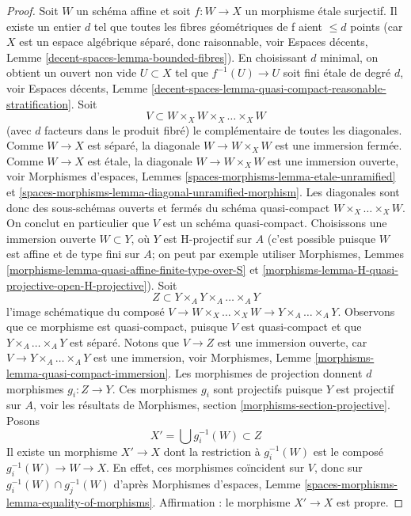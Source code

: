 \begin{proof}
Soit $W$ un schéma affine et soit $f : W \to X$ un morphisme
\'etale surjectif. Il existe un entier $d$ tel que toutes les fibres géométriques
de f aient $\leq d$ points (car $X$ est un espace algébrique séparé,
donc raisonnable, voir
Espaces décents, Lemme \ref{decent-spaces-lemma-bounded-fibres}).
En choisissant $d$ minimal, on obtient un ouvert non vide $U \subset X$ tel que
$f^{-1}(U) \to U$ soit fini \'etale de degré $d$, voir
Espaces décents, Lemme
\ref{decent-spaces-lemma-quasi-compact-reasonable-stratification}.
Soit
$$
V \subset W \times_X W \times_X \ldots \times_X W
$$
(avec $d$ facteurs dans le produit fibré) le complémentaire de toutes les diagonales.
Comme $W \to X$ est séparé, la diagonale $W \to W \times_X W$ est une
immersion fermée. Comme $W \to X$ est \'etale, la diagonale
$W \to W \times_X W$ est une immersion ouverte, voir
Morphismes d'espaces, Lemmes
\ref{spaces-morphisms-lemma-etale-unramified} et
\ref{spaces-morphisms-lemma-diagonal-unramified-morphism}.
Les diagonales sont donc des sous-schémas ouverts et fermés
du schéma quasi-compact $W \times_X \ldots \times_X W$.
On conclut en particulier que $V$ est un schéma quasi-compact.
Choisissons une immersion ouverte $W \subset Y$, où $Y$ est H-projectif sur
$A$ (c'est possible puisque $W$ est affine et de type fini sur $A$;
on peut par exemple utiliser
Morphismes, Lemmes
\ref{morphisms-lemma-quasi-affine-finite-type-over-S} et
\ref{morphisms-lemma-H-quasi-projective-open-H-projective}).
Soit
$$
Z \subset Y \times_A Y \times_A \ldots \times_A Y
$$
l'image schématique du composé
$V \to W \times_X \ldots \times_X W \to Y \times_A \ldots \times_A Y$.
Observons que ce morphisme est quasi-compact, puisque $V$ est quasi-compact
et que $Y \times_A \ldots \times_A Y$ est séparé.
Notons que $V \to Z$ est une immersion ouverte, car
$V \to Y \times_A \ldots \times_A Y$ est une immersion, voir
Morphismes, Lemme \ref{morphisms-lemma-quasi-compact-immersion}.
Les morphismes de projection donnent $d$ morphismes $g_i : Z \to Y$.
Ces morphismes $g_i$ sont projectifs puisque $Y$ est projectif sur $A$, voir
les résultats de Morphismes, section \ref{morphisms-section-projective}.
Posons
$$
X' = \bigcup g_i^{-1}(W) \subset Z
$$
Il existe un morphisme $X' \to X$ dont la restriction à $g_i^{-1}(W)$ est
le composé $g_i^{-1}(W) \to W \to X$.
En effet, ces morphismes coïncident sur $V$, donc sur
$g_i^{-1}(W) \cap g_j^{-1}(W)$ d'après
Morphismes d'espaces, Lemme \ref{spaces-morphisms-lemma-equality-of-morphisms}.
Affirmation : le morphisme $X' \to X$ est propre.


\end{proof}
